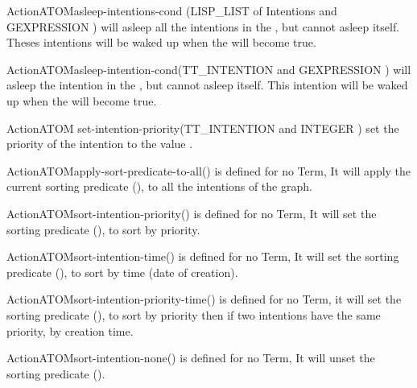 \begin{typeefa}{Action}{ATOM}{asleep-intentions-cond}
{(LISP\_LIST of Intentions and GEXPRESSION )}
will asleep all the intentions in the , but cannot asleep itself.
Theses intentions will be waked up when the  will become true.
\end{typeefa}

\begin{typeefa}{Action}{ATOM}{asleep-intention-cond}{(TT\_INTENTION and
GEXPRESSION )}
will asleep the intention in the , but cannot asleep itself.
This intention will be waked up when the  will become true.
\end{typeefa}

\begin{typeefa}{Action}{ATOM} {set-intention-priority}{(TT\_INTENTION and
INTEGER )}
set  the priority of the intention to the value .
\end{typeefa}

\begin{typeefa}{Action}{ATOM}{apply-sort-predicate-to-all}{()}
is defined for no Term, It will apply the current sorting predicate
(), to all the intentions of the
graph. 
\end{typeefa}

\begin{typeefa}{Action}{ATOM}{sort-intention-priority}{()}
is defined for no Term, It will set the sorting predicate (), to sort by priority. 
\end{typeefa}

\begin{typeefa}{Action}{ATOM}{sort-intention-time}{()}
is defined for no Term, It will set the sorting predicate (), to sort by time (date of 
creation).
\end{typeefa}

\begin{typeefa}{Action}{ATOM}{sort-intention-priority-time}{()}
is defined for no Term, it will set the sorting predicate (), to sort by priority then if two intentions have the
same priority, by creation time. 
\end{typeefa}

\begin{typeefa}{Action}{ATOM}{sort-intention-none}{()}
is defined for no Term, It will unset the sorting predicate (). 
\end{typeefa}

